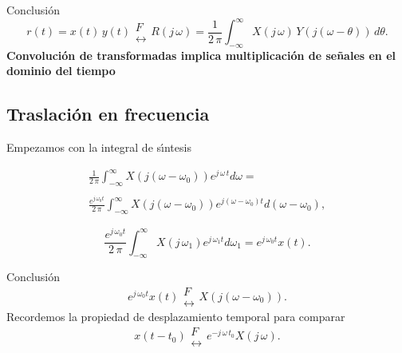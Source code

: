 Conclusi\'{o}n
\begin{equation}
        r\left( t\right) =x\left( t\right) \, y\left( t\right) 
        \begin{array}{l}
                F \\ 
                \leftrightarrow
        \end{array}     
        R\left( j \, \omega \right) =
                \frac{1}{2 \, \pi }
                        \int_{-\infty }^{\infty }
                                X\left(j \, \omega \right) \, Y\left( j\left( \omega -\theta \right) \right) \,
                        d\theta.
\end{equation}
\textbf{Convoluci\'{o}n de transformadas implica multiplicaci\'{o}n de se\~{n}ales en el dominio del 
tiempo}

\subsection{Traslaci\'{o}n en frecuencia}

Empezamos con la integral de s\'{\i}ntesis

\begin{equation}
\begin{array}{l}
     \frac{1}{2 \, \pi }\int_{-\infty }^{\infty }
         X\left( j\left( \omega -\omega_{0}\right) \right) e^{j \, \omega \, t}d\omega = \\ 
        \\ 
        \frac{e^{j \, \omega _{0}t}}{2 \, \pi } \int_{-\infty }^{\infty }
                X\left( j\left(\omega -\omega _{0}\right) \right) e^{j\left( \omega -\omega _{0}\right)t}
                d\left( \omega -\omega _{0}\right) ,
\end{array}
\end{equation}

\begin{equation}
        \frac{e^{j \, \omega_{0}t}}{2 \, \pi }
        \int_{-\infty }^{\infty }X\left( j \, \omega_{1}\right) e^{j \, \omega _{1}t}d\omega _{1}=
        e^{j \, \omega _{0}t}x\left( t\right) .
\end{equation}

Conclusi\'{o}n 
\begin{equation}
e^{j \, \omega _{0}t}x\left( t\right)  
\begin{array}{l}
F \\ 
\leftrightarrow
\end{array}
 X\left( j\left( \omega -\omega _{0}\right) \right) .
\end{equation}
Recordemos la propiedad de desplazamiento temporal para comparar 
\begin{equation}
x\left( t-t_{0}\right)  
\begin{array}{l}
F \\ 
\leftrightarrow
\end{array}
 e^{-j \, \omega \, t_{0}}X\left( j \, \omega \right) .
\end{equation}

